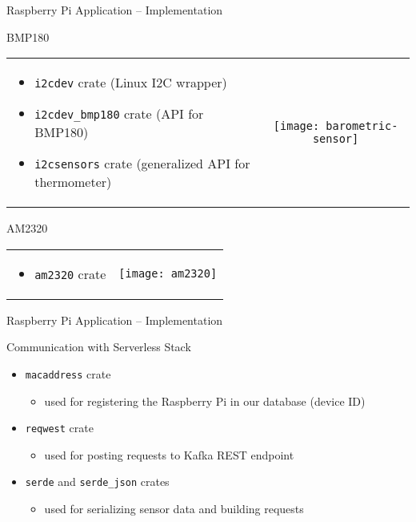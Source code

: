 \begin{frame}{Raspberry Pi Application -- Implementation}
  \begin{block}{BMP180}
    \begin{tabularx}{\textwidth}{XC}
      \begin{itemize}
        \item \texttt{i2cdev} crate (Linux I2C wrapper)
        \item \texttt{i2cdev\_bmp180} crate (API for BMP180)
        \item \texttt{i2csensors} crate (generalized API for thermometer)
      \end{itemize}
      &
      \texttt{[image: barometric-sensor]}
    \end{tabularx}
  \end{block}

  \begin{block}{AM2320}
    \begin{tabularx}{\textwidth}{XC}
      \begin{itemize}
        \item \texttt{am2320} crate
      \end{itemize}
      &
      \texttt{[image: am2320]}
    \end{tabularx}
  \end{block}
\end{frame}

\begin{frame}{Raspberry Pi Application -- Implementation}
  \begin{block}{Communication with Serverless Stack}
    \begin{itemize}
      \item \texttt{macaddress} crate
        \begin{itemize}
          \item used for registering the Raspberry Pi in our database (device ID)
        \end{itemize}
      \item \texttt{reqwest} crate
        \begin{itemize}
          \item used for posting requests to Kafka REST endpoint
        \end{itemize}
      \item \texttt{serde} and \texttt{serde\_json} crates
        \begin{itemize}
          \item used for serializing sensor data and building requests
        \end{itemize}
    \end{itemize}
  \end{block}
\end{frame}

